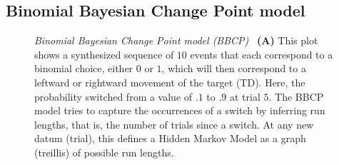 \documentclass[12pt,english]{article}%
\newcommand{\seeFig}[1]{Figure~\ref{fig:#1}}
\begin{document}
\subsection{Binomial Bayesian Change Point model}
\begin{figure}%
\caption{\emph{Binomial Bayesian Change Point model (BBCP)}
~\textbf{(A)} This plot shows a synthesized sequence of $10$ events
that each correspond to a binomial choice, either $0$ or $1$,
which will then correspond to a leftward or rightward movement of the target (TD).
Here, the probability switched from a value of $.1$ to $.9$ at trial $5$.
The BBCP model tries to capture the occurrences of a switch by inferring run lengths,
that is, the number of trials since a switch.
At any new datum (trial), this defines a Hidden Markov Model
as a graph (treillis) of possible run lengths.
}
\end{figure}
\end{document}
